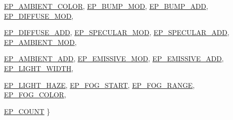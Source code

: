 \begin{CompactItemize}
\hyperlink{class_gr_shader_2f004c603bb97711d05eb68381a5a7baad8d46e4d63c30652cfe863781d31eef}{EP\_\-AMBIENT\_\-COLOR}, 
\hyperlink{class_gr_shader_2f004c603bb97711d05eb68381a5a7ba3f52eed666dad2ab377a721dec7d48c2}{EP\_\-BUMP\_\-MOD}, 
\hyperlink{class_gr_shader_2f004c603bb97711d05eb68381a5a7baca21fbc32f19ff7f96d197e91fa8241f}{EP\_\-BUMP\_\-ADD}, 
\hyperlink{class_gr_shader_2f004c603bb97711d05eb68381a5a7babd45973b924f00252c2b0119fe5b3fe5}{EP\_\-DIFFUSE\_\-MOD}, 
\par
\hyperlink{class_gr_shader_2f004c603bb97711d05eb68381a5a7ba2a9f47816bdefe2925a532af749de481}{EP\_\-DIFFUSE\_\-ADD}, 
\hyperlink{class_gr_shader_2f004c603bb97711d05eb68381a5a7ba34e4a46829351d19558379ff1494375d}{EP\_\-SPECULAR\_\-MOD}, 
\hyperlink{class_gr_shader_2f004c603bb97711d05eb68381a5a7ba92003f10db0b04b9d2230108be48e2e0}{EP\_\-SPECULAR\_\-ADD}, 
\hyperlink{class_gr_shader_2f004c603bb97711d05eb68381a5a7ba86a132318fcf5a928f1666362820d223}{EP\_\-AMBIENT\_\-MOD}, 
\par
\hyperlink{class_gr_shader_2f004c603bb97711d05eb68381a5a7ba651d45a736222bdf3a1901ba4784418f}{EP\_\-AMBIENT\_\-ADD}, 
\hyperlink{class_gr_shader_2f004c603bb97711d05eb68381a5a7baae7cb3eac81d8f1030bc823f55ebebc2}{EP\_\-EMISSIVE\_\-MOD}, 
\hyperlink{class_gr_shader_2f004c603bb97711d05eb68381a5a7ba8c8aaf9c9578270a5014a329d810bebd}{EP\_\-EMISSIVE\_\-ADD}, 
\hyperlink{class_gr_shader_2f004c603bb97711d05eb68381a5a7baec11ff622b6f49a33251e0a9626fb106}{EP\_\-LIGHT\_\-WIDTH}, 
\par
\hyperlink{class_gr_shader_2f004c603bb97711d05eb68381a5a7bae24509787b39e7258a4e25ecf2663e5d}{EP\_\-LIGHT\_\-HAZE}, 
\hyperlink{class_gr_shader_2f004c603bb97711d05eb68381a5a7bac116d1d297985a8983047e69c8f8c1d6}{EP\_\-FOG\_\-START}, 
\hyperlink{class_gr_shader_2f004c603bb97711d05eb68381a5a7bad96706cfb5f9b798c98f8c12bb6b0862}{EP\_\-FOG\_\-RANGE}, 
\hyperlink{class_gr_shader_2f004c603bb97711d05eb68381a5a7ba74327915bc548e45e31bbe4ffc1f6336}{EP\_\-FOG\_\-COLOR}, 
\par
\hyperlink{class_gr_shader_2f004c603bb97711d05eb68381a5a7ba5824c13eb2e93df0317ef2af40eabace}{EP\_\-COUNT}
 \}

\end{CompactItemize}
